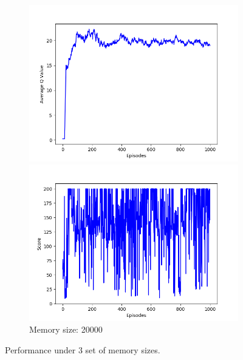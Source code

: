 \documentclass{article}
\begin{document}
\begin{figure}[!htbp]
  \begin{subfigure}{\textwidth}
    \begin{minipage}{0.5\textwidth}
      \centering
      \includegraphics[scale=0.45]{../experiments/mem_size_20000/qvalues.png}
    \end{minipage}
    \begin{minipage}{0.5\textwidth}
      \centering
      \includegraphics[scale=0.45]{../experiments/mem_size_20000/scores.png}
    \end{minipage}
    \caption{Memory size: 20000}
  \end{subfigure}%
  \caption{Performance under 3 set of memory sizes.}
  \label{memory size}
\end{figure}
\end{document}
